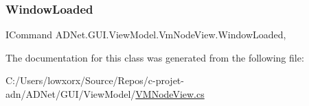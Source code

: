 \subsubsection{\texorpdfstring{Window\+Loaded}{WindowLoaded}}
{\footnotesize\ttfamily I\+Command A\+D\+Net.\+G\+U\+I.\+View\+Model.\+Vm\+Node\+View.\+Window\+Loaded\hspace{0.3cm}{\ttfamily [get]}, {\ttfamily [set]}}



The documentation for this class was generated from the following file\+:\begin{DoxyCompactItemize}
\item 
C\+:/\+Users/lowxorx/\+Source/\+Repos/c-\/projet-\/adn/\+A\+D\+Net/\+G\+U\+I/\+View\+Model/\hyperlink{_v_m_node_view_8cs}{V\+M\+Node\+View.\+cs}\end{DoxyCompactItemize}
